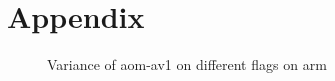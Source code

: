 \section{Appendix} \label{sec:appendix}

\begin{figure}[H]
  \centering
  
  \caption{Variance of aom-av1 on different flags on arm}
  \label{fig:EncoderModeSpeed6TwoPassInputBosphorus4K}
\end{figure}
